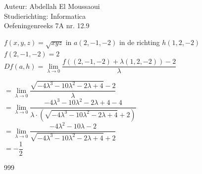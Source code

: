 \documentclass[a4paper]{article}
\begin{document}
  
\noindent \large Auteur: Abdellah El Moussaoui \\
\noindent \large Studierichting: Informatica\\
\noindent \large Oefeningenreeks 7A nr. 12.9\\

\medskip

\normalsize

$f(x,y,z) =\sqrt{xyz}$ in $a(2,-1,-2)$ in de richting $h(1,2,-2)$\\

$f(2,-1,-2) = 2$\\

$Df(a,h) = \lim\limits_{\lambda \rightarrow 0} \dfrac{f\left((2,-1,-2) + \lambda(1,2,-2)\right) - 2}{\lambda}$

$= \lim\limits_{\lambda \rightarrow 0} \dfrac{\sqrt{-4\lambda^3 - 10\lambda^2 - 2\lambda + 4} - 2}{\lambda}$\\


$= \lim\limits_{\lambda \rightarrow 0} \dfrac{-4\lambda^3-10\lambda^2-2\lambda + 4 - 4}{\lambda\cdot \left( \sqrt{-4\lambda^3-10\lambda^2-2\lambda + 4} + 2 \right)}$\\

$= \lim\limits_{\lambda \rightarrow 0} \dfrac{-4\lambda^2-10\lambda-2}{\sqrt{-4\lambda^3-10\lambda^2-2\lambda + 4} + 2}$\\

$=-\dfrac{1}{2}$\\


\begin{thebibliography}{999}
\end{thebibliography}
\end{document}
